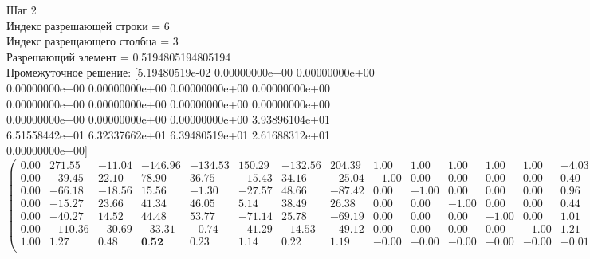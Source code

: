 \documentclass[draft]{article}
\begin{document}
\begin{flushleft}
    Шаг 2 \\
    Индекс разрешающей строки = 6\\
    Индекс разрещающего столбца = 3\\
    Разрешающий элемент = 0.5194805194805194\\
    Промежуточное решение:
    [5.19480519e-02  0.00000000e+00  0.00000000e+00  0.00000000e+00
    0.00000000e+00  0.00000000e+00  0.00000000e+00  0.00000000e+00
    0.00000000e+00  0.00000000e+00  0.00000000e+00  0.00000000e+00
    0.00000000e+00  0.00000000e+00  3.93896104e+01  6.51558442e+01
    6.32337662e+01  6.39480519e+01  2.61688312e+01  0.00000000e+00]
\begin{equation*}
\begin{pmatrix}
    0.00 &  271.55 & -11.04 & -146.96 & -134.53 & 150.29 & -132.56 & 204.39 &  1.00 &  1.00 &  1.00 &  1.00 &  1.00 & -4.03 & 0.00 & 0.00 & 0.00 & 0.00 & 0.00 &  5.03 & -257.90 \\
    0.00 &  -39.45 &  22.10 &   78.90 &   36.75 & -15.43 &   34.16 & -25.04 & -1.00 &  0.00 &  0.00 &  0.00 &  0.00 &  0.40 & 1.00 & 0.00 & 0.00 & 0.00 & 0.00 & -0.40 &   39.39 \\
    0.00 &  -66.18 & -18.56 &   15.56 &   -1.30 & -27.57 &   48.66 & -87.42 &  0.00 & -1.00 &  0.00 &  0.00 &  0.00 &  0.96 & 0.00 & 1.00 & 0.00 & 0.00 & 0.00 & -0.96 &   65.16 \\
    0.00 &  -15.27 &  23.66 &   41.34 &   46.05 &   5.14 &   38.49 &  26.38 &  0.00 &  0.00 & -1.00 &  0.00 &  0.00 &  0.44 & 0.00 & 0.00 & 1.00 & 0.00 & 0.00 & -0.44 &   63.23 \\
    0.00 &  -40.27 &  14.52 &   44.48 &   53.77 & -71.14 &   25.78 & -69.19 &  0.00 &  0.00 &  0.00 & -1.00 &  0.00 &  1.01 & 0.00 & 0.00 & 0.00 & 1.00 & 0.00 & -1.01 &   63.95 \\
    0.00 & -110.36 & -30.69 &  -33.31 &   -0.74 & -41.29 &  -14.53 & -49.12 &  0.00 &  0.00 &  0.00 &  0.00 & -1.00 &  1.21 & 0.00 & 0.00 & 0.00 & 0.00 & 1.00 & -1.21 &   26.17 \\
    1.00 &    1.27 &   0.48 &    \textbf{0.52} &    0.23 &   1.14 &    0.22 &   1.19 & -0.00 & -0.00 & -0.00 & -0.00 & -0.00 & -0.01 & 0.00 & 0.00 & 0.00 & 0.00 & 0.00 &  0.01 &    0.05 \\
\end{pmatrix}
\end{equation*}
\end{flushleft}
\end{document}

